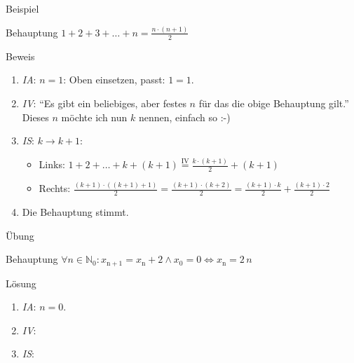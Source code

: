 \documentclass[18pt]{beamer}
\begin{document}
\begin{frame}{Beispiel}
    \begin{block}{Behauptung}
        $ 1 + 2 + 3 + \dots + n = \frac{ n\cdot \left( n + 1\right) }{2}$\\
    \end{block}
    \pause
    \begin{block}{Beweis}
        \begin{enumerate}
            \item \emph{IA}: $n = 1$: Oben einsetzen, passt: $1 = 1$.
                \pause
            \item \emph{IV}: "`Es gibt ein beliebiges, aber festes $n$ für das die obige Behauptung gilt."' Dieses $n$ möchte ich nun $k$ nennen, einfach so :-)
                \pause
            \item \emph{IS}: $k \rightarrow k + 1$: 
                \begin{itemize}
                    \item Links: $ 1 + 2 + \dots + k + \left( k+1\right) \overset{\text{IV}}{=} \frac{k\cdot \left( k + 1\right)}{2} + \left( k + 1\right)$
                    \item Rechts: $\frac{\left(k + 1\right) \cdot \left(\left( k + 1\right) + 1\right)}{2} = \frac{\left( k + 1\right) \cdot \left( k + 2\right)}{2} = \frac{\left( k + 1\right) \cdot k}{2}  + \frac{\left( k + 1\right)\cdot 2}{2}$
                \end{itemize}
                \pause
            \item Die Behauptung stimmt.
        \end{enumerate}
    \end{block}
\end{frame}

\begin{frame}{Übung}
    \begin{block}{Behauptung}
        $\forall n \in \mathbb{N}_0 : x_{\mathrm{n + 1}} = x_\mathrm{n} + 2 \wedge x_0 = 0 \Leftrightarrow x_\mathrm{n} = 2\, n$
    \end{block}
    \pause
    \begin{block}{Lösung}
        \begin{enumerate}
            \item \emph{IA}: $n = 0$. 
                \pause
            \item \emph{IV}: 
                \pause
            \item \emph{IS}:\\ 
        \end{enumerate}
    \end{block}
\end{frame}
\end{document}
